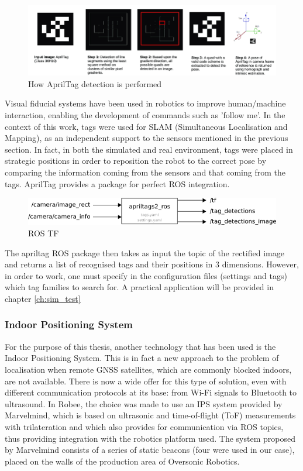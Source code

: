 \begin{figure}[H]
    \centering
    \includegraphics[scale=0.6]{Images/Chapter 3/apriltagsteps.png}
    \caption{How AprilTag detection is performed}
    \label{fig:apriltagsteps}
\end{figure}
Visual fiducial systems have been used in robotics to improve human/machine interaction, enabling the development of commands such as 'follow me'.
In the context of this work, tags were used for SLAM (Simultaneous Localisation and Mapping), as an independent support to the sensors mentioned in the previous section.
In fact, in both the simulated and real environment, tags were placed in strategic positions in order to reposition the robot to the correct pose by comparing the information coming from the sensors and that coming from the tags.
AprilTag provides a package for perfect ROS integration.
\begin{figure}[H]
    \centering
    \includegraphics{Images/Chapter 3/aprilros.png}
    \caption{ROS TF}
    \label{fig:aprilros}
\end{figure}

The apriltag ROS package then takes as input the topic of the rectified image and returns a list of recognised tags and their positions in 3 dimensions.
However, in order to work, one must specify in the configuration files (settings and tags) which tag families to search for.
A practical application will be provided in chapter \ref{ch:sim_test}

\subsubsection{Indoor Positioning System}

For the purpose of this thesis, another technology that has been used is the Indoor Positioning System.
This is in fact a new approach to the problem of localisation when remote GNSS satellites, which are commonly blocked indoors, are not available.
There is now a wide offer for this type of solution, even with different communication protocols at its base: from Wi-Fi signals to Bluetooth to ultrasound.
In Robee, the choice was made to use an IPS system provided by Marvelmind, which is based on ultrasonic and time-of-flight (ToF) measurements with trilateration and which also provides for communication via ROS topics, thus providing integration with the robotics platform used.
The system proposed by Marvelmind consists of a series of static beacons (four were used in our case), placed on the walls of the production area of Oversonic Robotics.


